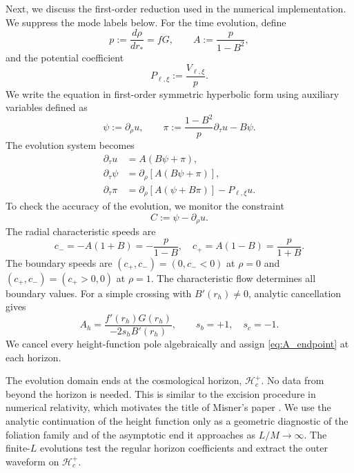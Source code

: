 \documentclass[
 aps,
 prd,
 reprint,
 superscriptaddress,
 nofootinbib,
 longbibliography
]{revtex4-2}
\newcommand{\hc}{\mathcal{H}_{c}^{+}}
\begin{document}
Next, we discuss the first-order reduction used in the numerical implementation.  We suppress the mode labels below.  For the time evolution, define
\begin{equation}
 p:=\frac{d\rho}{dr_*}=fG, \qquad
 A:=\frac{p}{1-B^2},
 \label{eq:coefficients}
\end{equation}
and the potential coefficient
\begin{equation}
 P_{\ell,\xi}:=\frac{V_{\ell,\xi}}{p}.
 \label{eq:potential_coefficient}
\end{equation}
We write the equation in first-order symmetric hyperbolic form using auxiliary variables defined as
\begin{equation}
 \psi:=\partial_\rho u,\qquad
 \pi:=\frac{1-B^2}{p}\partial_\tau u-B\psi.
 \label{eq:first_order_variables}
\end{equation}
The evolution system becomes
\begin{align}
 \partial_\tau u&=A(B\psi+\pi),
 \label{eq:evolve_u}\\
 \partial_\tau\psi&=\partial_\rho\!\left[A(B\psi+\pi)\right],
 \label{eq:evolve_psi}\\
 \partial_\tau\pi&=\partial_\rho\!\left[A(\psi+B\pi)\right]-P_{\ell,\xi}u.
 \label{eq:evolve_pi}
\end{align}
To check the accuracy of the evolution, we monitor the constraint
\begin{equation}
 C:=\psi-\partial_\rho u.
 \label{eq:constraint}
\end{equation}
The radial characteristic speeds are
\begin{equation}
 c_-=-A(1+B)=-\frac{p}{1-B}, \quad c_+=A(1-B)=\frac{p}{1+B}.
 \label{eq:characteristic_speeds}
\end{equation}
The boundary speeds are $(c_+,c_-)=(0,c_-<0)$ at $\rho=0$ and
$(c_+,c_-)=(c_+>0,0)$ at $\rho=1$.  The characteristic flow determines all
boundary values.  For a
simple crossing with $B'(r_h)\ne0$, analytic cancellation gives
\begin{equation}
 A_h=\frac{f'(r_h)G(r_h)}{-2s_hB'(r_h)},\qquad
 s_b=+1,\quad s_c=-1.
 \label{eq:A_endpoint}
\end{equation}
We cancel every height-function pole algebraically and assign
\eqref{eq:A_endpoint} at each horizon.

The evolution domain ends at the cosmological horizon, $\hc$. No data from beyond the horizon is needed. This is similar to the excision procedure in numerical relativity, which motivates the title of Misner's paper \cite{misner_excising_2006}. We use the analytic continuation of the height function only as
a geometric diagnostic of the foliation family and of the asymptotic end it
approaches as $L/M\to\infty$.  The finite-$L$ evolutions test the regular
horizon coefficients and extract the outer waveform on $\hc$.
\end{document}
